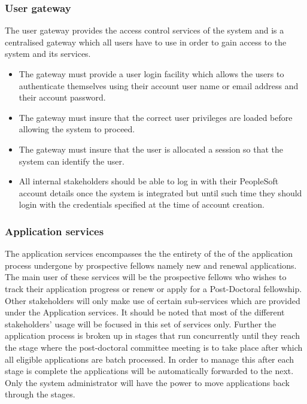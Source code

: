 \documentclass[12pt]{article}
\begin{document}
\subsubsection{User gateway}
The user gateway provides the access control services of the system and is a centralised gateway which all users have to use in order to gain access to the system and its services. 
\begin{itemize}
	\item The gateway must provide a user login facility which allows the users to authenticate themselves using their account user name or email address and their account password.
	\item The gateway must insure that the correct user privileges are loaded before allowing the system to proceed.
	\item The gateway must insure that the user is allocated a session so that the system can identify the user.
	\item All internal stakeholders should be able to log in with their PeopleSoft account details once the system is integrated but until such time they should login with the credentials specified at the time of account creation. 
\end{itemize}

\subsubsection{Application services}
		The application services encompasses the the entirety of the of the application process undergone by prospective fellows namely new and renewal applications.
		The main user of these services will be the prospective fellows who wishes to track their application progress or renew or apply for a Post-Doctoral fellowship. Other stakeholders will only make use of certain sub-services which are provided under the Application services. It should be noted that most of the different stakeholders' usage will be focused in this set of services only. Further the application process is broken up in stages that run concurrently until they reach the stage where the post-doctoral committee meeting is to take place after which all eligible applications are batch processed. In order to manage this after each stage is complete the applications will be automatically forwarded to the next. Only the system administrator will have the power to move applications back through the stages.
		
\end{document}

